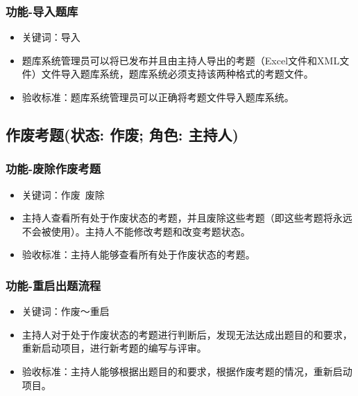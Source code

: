 \documentclass[hyperref, a4paper]{ctexart}
\begin{document}
\hypertarget{ux529fux80fd-ux5bfcux5165ux9898ux5e93}{%
\subsubsection{功能-导入题库}\label{ux529fux80fd-ux5bfcux5165ux9898ux5e93}}

\begin{itemize}
\item
  关键词：导入
\item
  题库系统管理员可以将已发布并且由主持人导出的考题（Excel文件和XML文件）文件导入题库系统，题库系统必须支持该两种格式的考题文件。
\item
  验收标准：题库系统管理员可以正确将考题文件导入题库系统。
\end{itemize}

\hypertarget{ux4f5cux5e9fux8003ux9898ux72b6ux6001-ux4f5cux5e9f-ux89d2ux8272-ux4e3bux6301ux4eba}{%
\subsection{作废考题(状态: 作废; 角色:
主持人)}\label{ux4f5cux5e9fux8003ux9898ux72b6ux6001-ux4f5cux5e9f-ux89d2ux8272-ux4e3bux6301ux4eba}}

\hypertarget{ux529fux80fd-ux5e9fux9664ux4f5cux5e9fux8003ux9898}{%
\subsubsection{功能-废除作废考题}\label{ux529fux80fd-ux5e9fux9664ux4f5cux5e9fux8003ux9898}}

\begin{itemize}
\item
  关键词：作废~废除
\item
  主持人查看所有处于作废状态的考题，并且废除这些考题（即这些考题将永远不会被使用）。主持人不能修改考题和改变考题状态。
\item
  验收标准：主持人能够查看所有处于作废状态的考题。
\end{itemize}

\hypertarget{ux529fux80fd-ux91cdux542fux51faux9898ux6d41ux7a0b}{%
\subsubsection{功能-重启出题流程}\label{ux529fux80fd-ux91cdux542fux51faux9898ux6d41ux7a0b}}

\begin{itemize}
\item
  关键词：作废～重启
\item
  主持人对于处于作废状态的考题进行判断后，发现无法达成出题目的和要求，重新启动项目，进行新考题的编写与评审。
\item
  验收标准：主持人能够根据出题目的和要求，根据作废考题的情况，重新启动项目。
\end{itemize}
\end{document}
